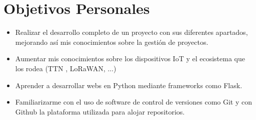 \section {Objetivos Personales} 
\begin{itemize}
   \item Realizar el desarrollo completo de un proyecto con sus diferentes apartados, mejorando así mis conocimientos sobre la gestión de proyectos.
    \item Aumentar mis conocimientos sobre los dispositivos IoT y el ecosistema que los rodea (TTN , LoRaWAN, ...)
    \item Aprender a desarrollar webs en Python mediante frameworks como Flask.
    \item Familiarizarme con el uso de software de control de versiones como Git y con Github la plataforma utilizada para alojar repositorios.
\end{itemize}